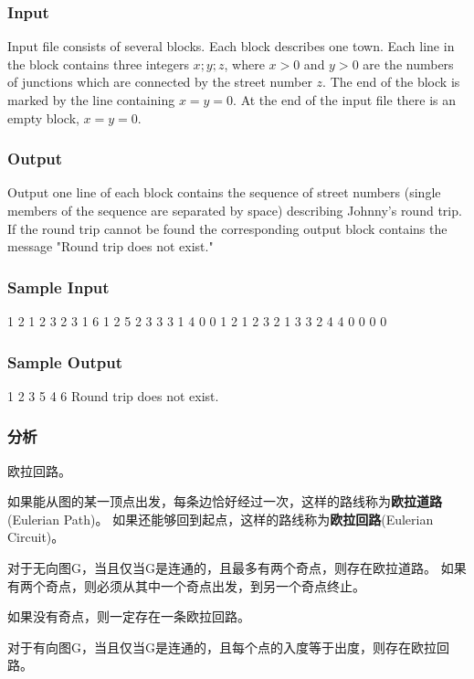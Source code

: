 \subsubsection{Input}
Input file consists of several blocks. Each block describes one town. Each line in the block contains three integers $x; y; z$, where $x > 0$ and $y > 0$ are the numbers of junctions which are connected by the street number $z$. The end of the block is marked by the line containing $x = y = 0$. At the end of the input file there is an empty block, $x = y = 0$.


\subsubsection{Output}
Output one line of each block contains the sequence of street numbers (single members of the sequence are separated by space) describing Johnny's round trip. If the round trip cannot be found the corresponding output block contains the message "Round trip does not exist."


\subsubsection{Sample Input}
\begin{Code}
1 2 1
2 3 2
3 1 6
1 2 5
2 3 3
3 1 4
0 0
1 2 1
2 3 2
1 3 3
2 4 4
0 0
0 0
\end{Code}

\subsubsection{Sample Output}
\begin{Code}
1 2 3 5 4 6 
Round trip does not exist.
\end{Code}

\subsubsection{分析}
欧拉回路。

如果能从图的某一顶点出发，每条边恰好经过一次，这样的路线称为\textbf{欧拉道路}(Eulerian Path)。
如果还能够回到起点，这样的路线称为\textbf{欧拉回路}(Eulerian Circuit)。

对于无向图G，当且仅当G是连通的，且最多有两个奇点，则存在欧拉道路。
如果有两个奇点，则必须从其中一个奇点出发，到另一个奇点终止。

如果没有奇点，则一定存在一条欧拉回路。

对于有向图G，当且仅当G是连通的，且每个点的入度等于出度，则存在欧拉回路。

